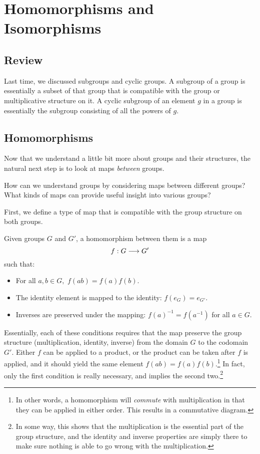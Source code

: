 
\section{Homomorphisms and Isomorphisms}
\subsection{Review}
Last time, we discussed subgroups and cyclic groups. A subgroup of a group is essentially a subset of that group that is compatible with the group or multiplicative structure on it. A cyclic subgroup of an element $g$ in a group is essentially the subgroup consisting of all the powers of $g.$
\subsection{Homomorphisms}
Now that we understand a little bit more about groups and their structures, the natural next step is to look at maps \emph{between} groups.
\begin{qq}
How can we understand groups by considering maps between different groups? What kinds of maps can provide useful insight into various groups?
\end{qq}

First, we define a type of map that is compatible with the group structure on both groups.

\begin{definition}
Given groups $G$ and $G'$, a homomorphism between them is a map 
\[
f: G \longrightarrow G'
\]
such that:
\begin{itemize}
    \item For all $a, b \in G,$ $f(ab) = f(a)f(b)$.
    \item The identity element is mapped to the identity: $f(e_G) = e_{G'}.$
    \item Inverses are preserved under the mapping: $f(a)^{-1}=f(a^{-1})$ for all $a \in G.$
\end{itemize}
\end{definition}

Essentially, each of these conditions requires that the map preserve the group structure (multiplication, identity, inverse) from the domain $G$ to the codomain $G'$. Either $f$ can be applied to a product, or the product can be taken after $f$ is applied, and it should yield the same element $f(ab) = f(a)f(b).$\footnote{In other words, a homomorphism will \emph{commute} with multiplication in that they can be applied in either order. This results in a commutative diagram.} In fact, only the first condition is really necessary, and implies the second two.\footnote{In some way, this shows that the multiplication is the essential part of the group structure, and the identity and inverse properties are simply there to make sure nothing is able to go wrong with the multiplication.}

